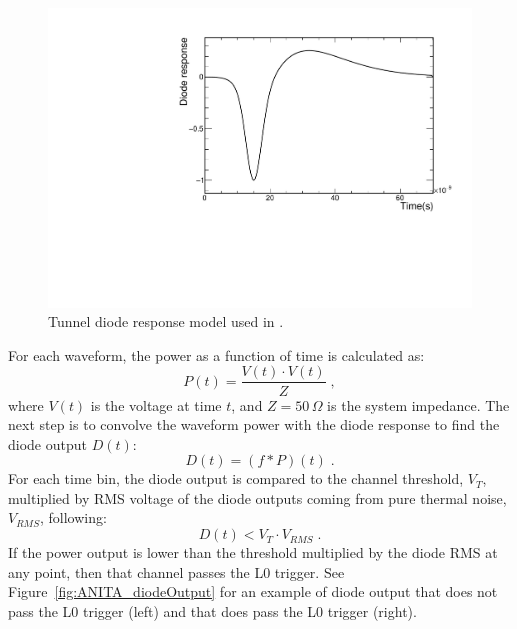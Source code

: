 \begin{figure}[!h]\centering
  \includegraphics[width=.45\linewidth]{./Figs/FullBand_diodeResponse.pdf}
  \caption{Tunnel diode response model used in \icemc.}
  \label{fig:ANITA_diodeModel}
\end{figure}

For each waveform, the power as a function of time is calculated as:
\begin{equation}
  P (t) = \dfrac{V(t) \cdot V(t)}{Z} \;,
\end{equation}
\noindent where $V(t)$ is the voltage at time $t$, and $Z=50\,\Omega$ is the system impedance.
The next step is to convolve the waveform power with the diode
response to find the diode output $D(t)$:
\begin{equation}
  D(t) = (f * P)(t) \;.
\end{equation}
For each time bin, the diode output is compared to the channel
threshold, $V_T$, multiplied by RMS voltage of the diode outputs coming from pure thermal noise, $V_{RMS}$, following:
\begin{equation} 
  D(t) < V_T \cdot V_{RMS} \;.
\end{equation}
If the power output is lower than the threshold multiplied by the diode RMS at any point, then that channel passes the L0 trigger.
  See Figure~\ref{fig:ANITA_diodeOutput} for an example of diode
  output that does not pass the L0 trigger (left) and that does pass
  the L0 trigger (right).

